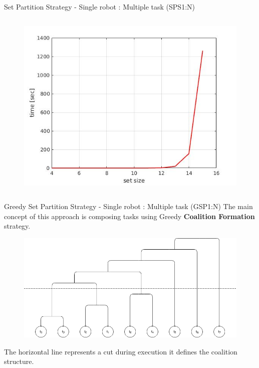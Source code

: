 \begin{frame}[fragile]{Set Partition Strategy - Single robot : Multiple task (SPS1:N)}
\begin{columns}
\begin{column}{.4\textwidth}
\begin{figure}
                \includegraphics[width=\textwidth]{img/exp}
            \end{figure}
            \end{column}
        \end{columns}
    \end{frame}

    \begin{frame}[fragile]{Greedy Set Partition Strategy - Single robot : Multiple task (GSP1:N)}
        The main concept of this approach is composing tasks using Greedy {\bf Coalition Formation} strategy.
        \begin{figure}[hbt]
            \centering
            \includegraphics[width=\textwidth]{img/CF.png}
        \end{figure}
        The horizontal line represents a cut during execution it defines the coalition structure.
    \end{frame}

